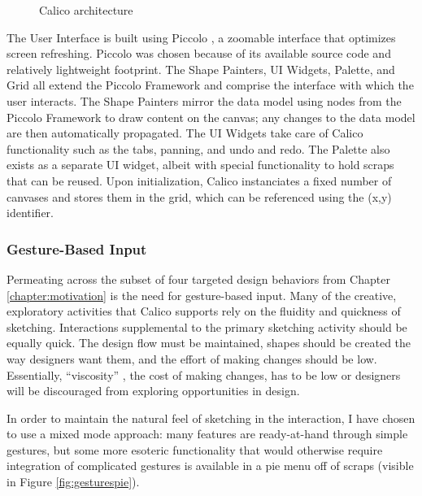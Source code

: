 \begin{figure}
  \centering
 
\caption {Calico architecture}
\label{fig:arch}       %
\end{figure}
%

The User Interface is built using Piccolo \citep{Bederson}, a zoomable interface that optimizes screen refreshing. Piccolo was chosen because of its available source code and relatively lightweight footprint. The Shape Painters, UI Widgets, Palette, and Grid all extend the Piccolo Framework and comprise the interface with which the user interacts. The Shape Painters mirror the data model using nodes from the Piccolo Framework to draw content on the canvas; any changes to the data model are then automatically propagated. The UI Widgets take care of Calico functionality such as the tabs, panning, and undo and redo. The Palette also exists as a separate UI widget, albeit with special functionality to hold scraps that can be reused. Upon initialization, Calico instanciates a fixed number of canvases and stores them in the grid, which can be referenced using the (x,y) identifier. 

\subsubsection {Gesture-Based Input}
\label{calico:5}

Permeating across the subset of four targeted design behaviors from Chapter \ref{chapter:motivation} is the need for gesture-based input. Many of the creative, exploratory activities that Calico supports rely on the fluidity and quickness of sketching. Interactions supplemental to the primary sketching activity should be equally quick. The design flow must be maintained, shapes should be created the way designers want them, and the effort of making changes should be low. Essentially, ``viscosity'' \citep{petre2009insights}, the cost of making changes, has to be low or designers will be discouraged from exploring opportunities in design. 

In order to maintain the natural feel of sketching in the interaction, I have chosen to use a mixed mode approach: many features are ready-at-hand through simple gestures, but some more esoteric functionality that would otherwise require integration of complicated gestures is available in a pie menu off of scraps (visible in Figure \ref{fig:gesturespie}).

